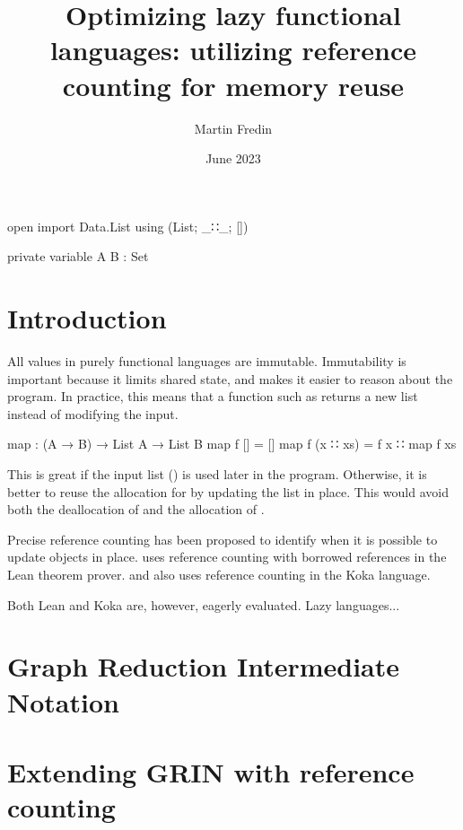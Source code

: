 \documentclass{article}
\title{
Optimizing lazy functional languages: utilizing reference counting for memory reuse
}
\author{Martin Fredin}
\date{June 2023}
\begin{document}
\maketitle

\begin{code}[hide]
open import Data.List using (List; _∷_; [])

private 
  variable
    A B : Set

\end{code}

\section{Introduction}

All values in purely functional languages are immutable.
Immutability is important because it limits shared state, and makes it easier to reason about the program.
In practice, this means that a function such as  returns a new list instead of modifying the input.
\begin{code}
map : (A → B) → List A → List B
map f []       = []
map f (x ∷ xs) = f x ∷ map f xs
\end{code}
This is great if the input list (\AgdaSpace{}) is used later in the program. 
Otherwise, it is better to reuse the allocation for \AgdaSpace{} by updating the list in place. 
This would avoid both the deallocation of \AgdaSpace{} and the allocation of \AgdaSpace{}.

Precise reference counting has been proposed to identify when it is possible to update objects in place. 
\citet{ullrich2021} uses reference counting with borrowed references in the Lean theorem prover. 
\citet{reinking2020} \citet{lorenzen2022} and \citet{lorenzen2023} also uses reference counting in the Koka language.

Both Lean and Koka are, however, eagerly evaluated. Lazy languages...


\section{Graph Reduction Intermediate Notation}

\section{Extending GRIN with reference counting}
\end{document}
